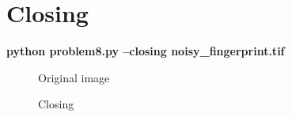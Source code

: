 \section{Closing}

\textbf{python problem8.py --closing noisy\_fingerprint.tif}

\begin{figure}[!htb]\centering
    \begin{minipage}{0.45\textwidth}
        \caption{\small{Original image}}
    \end{minipage}
    \begin{minipage}{0.45\textwidth}
        \caption{\small{Closing}}\label{diagram:closing}
    \end{minipage}
\end{figure}


